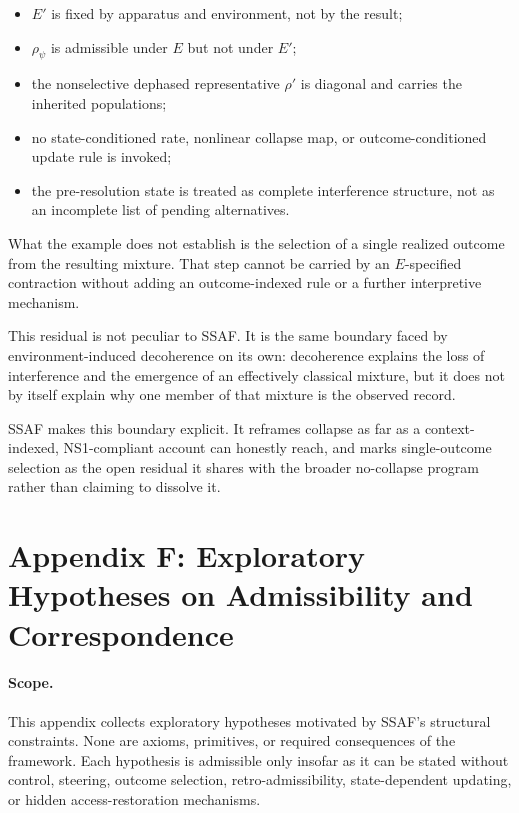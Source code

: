 \documentclass[aps,prx,onecolumn,11pt]{revtex4-2}
\theoremstyle{plain}
\theoremstyle{definition}
\theoremstyle{remark}
\begin{document}
\begin{itemize}
\item \(E'\) is fixed by apparatus and environment, not by the result;
\item \(\rho_\psi\) is admissible under \(E\) but not under \(E'\);
\item the nonselective dephased representative \(\rho'\) is diagonal
and carries the inherited populations;
\item no state-conditioned rate, nonlinear collapse map, or
outcome-conditioned update rule is invoked;
\item the pre-resolution state is treated as complete interference
structure, not as an incomplete list of pending alternatives.
\end{itemize}

What the example does not establish is the selection of a single
realized outcome from the resulting mixture. That step cannot be
carried by an \(E\)-specified contraction without adding an
outcome-indexed rule or a further interpretive mechanism.

This residual is not peculiar to SSAF. It is the same boundary faced by
environment-induced decoherence on its own: decoherence explains the
loss of interference and the emergence of an effectively classical
mixture, but it does not by itself explain why one member of that
mixture is the observed record.

SSAF makes this boundary explicit. It reframes collapse as far as a
context-indexed, NS1-compliant account can honestly reach, and marks
single-outcome selection as the open residual it shares with the broader
no-collapse program rather than claiming to dissolve it.

\section{Appendix F: Exploratory Hypotheses on Admissibility and Correspondence}
\label{appF:exploratory_hypotheses}

\paragraph{Scope.}

This appendix collects exploratory hypotheses motivated by SSAF's
structural constraints. None are axioms, primitives, or required
consequences of the framework. Each hypothesis is admissible only
insofar as it can be stated without control, steering, outcome
selection, retro-admissibility, state-dependent updating, or hidden
access-restoration mechanisms.
\end{document}
